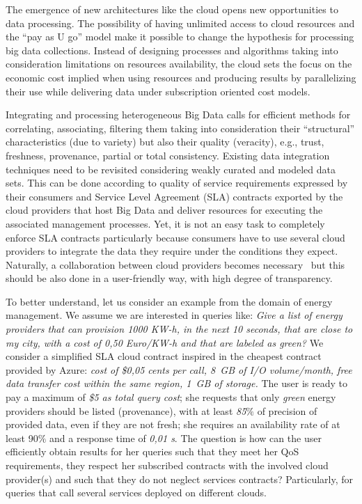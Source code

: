 The emergence of new architectures like the cloud opens new opportunities to data processing. 
The possibility of having unlimited access to cloud resources and the ``pay as U go'' model make it possible to change the hypothesis for processing big  data collections.  Instead of designing processes and algorithms taking into consideration  limitations on resources availability, the cloud sets the focus on the economic cost implied when using resources and producing results by parallelizing their use while delivering data under subscription oriented cost models.
 
Integrating and processing heterogeneous Big Data calls for efficient methods for correlating, associating, filtering them taking into consideration their ``structural'' characteristics (due to variety) but also their quality (veracity), e.g., trust, freshness, provenance, partial or total consistency. 
Existing data integration techniques need to be revisited considering weakly curated and modeled data sets. This can be done according to quality of service requirements expressed by their consumers and Service Level Agreement (SLA) contracts exported by the cloud providers that host  Big Data and deliver resources for executing the associated management processes. Yet, it is not an easy task to completely enforce SLA contracts particularly because consumers have to use several cloud providers to integrate the data they require under the conditions they expect.
Naturally, a collaboration between cloud providers becomes necessary~\cite{036} but this should be also done in a user-friendly way, with high degree of transparency. 

To better understand, let us consider an example from the domain of energy
management. We assume we are interested in queries like: \textit{Give a list
of energy providers that can provision 1000 KW-h, in the next 10 seconds, that are close to my city, with a cost of 0,50 Euro/KW-h and that are labeled as green?} We consider a simplified SLA cloud contract inspired in the cheapest contract provided by Azure: \textit{cost of \$0,05 cents per call,  8~GB of I/O volume/month, free data transfer cost within the same region,  1~GB of storage.} 
The user is ready to pay a maximum of \textit{\$5 as total query cost}; she requests that only  \textit{green} energy providers should be  listed (provenance), with at least  \textit{85$\%$} of precision of provided data, even if they are not fresh; she requires an availability rate of at least 90$\%$ and a response time of  \textit{0,01 s}. 
  The question is how can the user efficiently obtain  results for her queries such that they meet her QoS requirements, they respect her subscribed contracts with the involved cloud provider(s) and such that they do not neglect services contracts? Particularly, for queries that call several services deployed  on different clouds.

